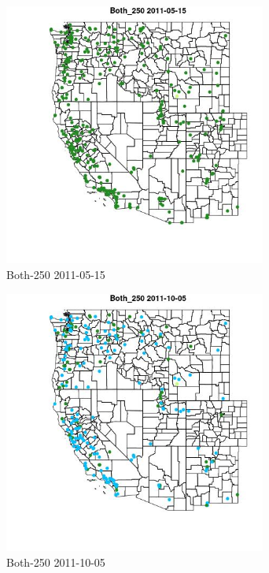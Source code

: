 \begin{figure} 
\centering  
\includegraphics[width=0.77\textwidth]{Code_Outputs/ML_input_report_ML_input_PM25_Step5_part_d_de_duplicated_aves_ML_input_MapObsBoth_2502011-05-15.jpg} 
\caption{\label{fig:ML_input_report_ML_input_PM25_Step5_part_d_de_duplicated_aves_ML_inputMapObsBoth_2502011-05-15}Both-250 2011-05-15} 
\end{figure} 
 

\begin{figure} 
\centering  
\includegraphics[width=0.77\textwidth]{Code_Outputs/ML_input_report_ML_input_PM25_Step5_part_d_de_duplicated_aves_ML_input_MapObsBoth_2502011-10-05.jpg} 
\caption{\label{fig:ML_input_report_ML_input_PM25_Step5_part_d_de_duplicated_aves_ML_inputMapObsBoth_2502011-10-05}Both-250 2011-10-05} 
\end{figure} 
 

